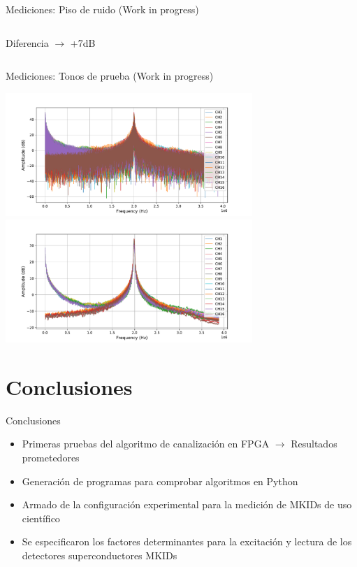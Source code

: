 \documentclass[ignorenonframetext,12pt]{beamer}
\begin{document}
\begin{frame}{Mediciones: Piso de ruido (Work in progress)}
\begin{columns}
\begin{column}{0.5\textwidth}{\footnotesize{Diferencia
																$\to$ +7dB}}
												\end{column}
								\end{columns}
				\end{frame}

				\begin{frame}{Mediciones: Tonos de prueba (Work in progress)}
								\begin{center}
												\includegraphics[width=0.7\textwidth]{fdm_out_ch16_2mhz}
												\includegraphics[width=0.7\textwidth]{ma_fdm_out_ch16_2mhz}
								\end{center}
				\end{frame}

\section{Conclusiones}
\begin{frame}{Conclusiones}
				\begin{itemize}
								\item Primeras pruebas del algoritmo de canalización en FPGA
												$\to$	Resultados prometedores
								\item Generación de programas para comprobar algoritmos en Python
								\item Armado de la configuración experimental para la medición
												de MKIDs de uso científico
								\item Se especificaron los factores determinantes para la
												excitación y lectura de los detectores superconductores MKIDs
				\end{itemize}
\end{frame}
\end{document}

